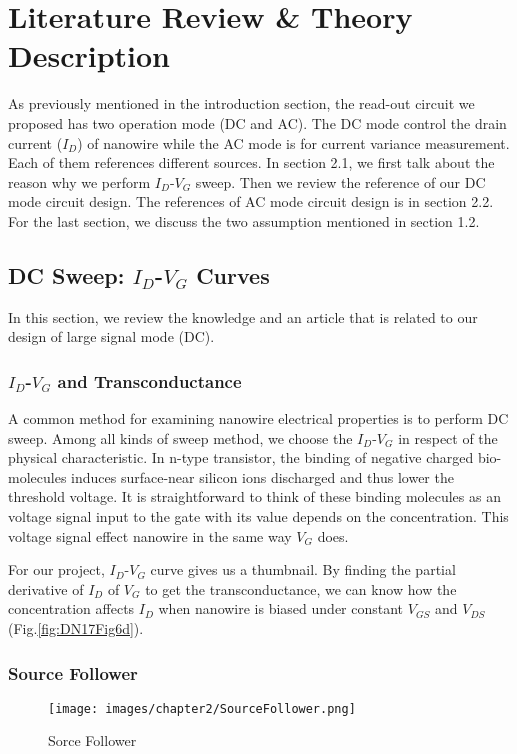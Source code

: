 \chapter{Literature Review \& Theory Description}
As previously mentioned in the introduction section, the read-out circuit we proposed has two operation mode (DC and AC).
The DC mode control the drain current ($I_D$) of nanowire while the AC mode is for current variance measurement.
Each of them references different sources.
In section 2.1, we first talk about the reason why we perform $I_D$-$V_G$ sweep.
Then we review the reference of our DC mode circuit design.
The references of AC mode circuit design is in section 2.2.
For the last section, we discuss the two assumption mentioned in section 1.2.

\section{DC Sweep: $I_D$-$V_G$ Curves}
In this section, we review the knowledge and an article that is related to our design of large signal mode (DC).

\subsection{$I_D$-$V_G$ and Transconductance}
A common method for examining nanowire electrical properties is to perform DC sweep.
Among all kinds of sweep method, we choose the $I_D$-$V_G$ in respect of the physical characteristic.
In n-type transistor, the binding of negative charged bio-molecules induces surface-near silicon ions discharged and thus lower the threshold voltage.
It is straightforward to think of these binding molecules as an voltage signal input to the gate with its value depends on the concentration.
This voltage signal effect nanowire in the same way $V_G$ does.

For our project, $I_D$-$V_G$ curve gives us a thumbnail.
By finding the partial derivative of $I_D$ of $V_{G}$ to get the transconductance,
we can know how the concentration affects $I_D$ when nanowire is biased under constant $V_{GS}$ and $V_{DS}$ (Fig.\ref{fig:DN17Fig6d}).


\subsection{Source Follower}

\begin{figure}[h]
    \centering
    \texttt{[image: images/chapter2/SourceFollower.png]}
    \fontsize{6}{7}\selectfont
    \caption{Sorce Follower}
    \label{fig:SF}
\end{figure}


